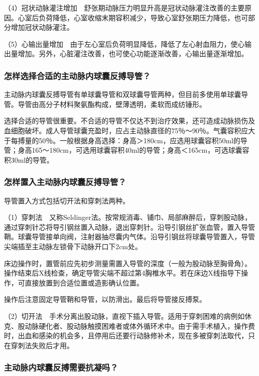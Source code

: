 （4）冠状动脉灌注增加　舒张期动脉压力明显升高是冠状动脉灌注改善的主要原因。心室后负荷降低，心室收缩末期容积减少，导致心室舒张期压力降低，也可部分增加冠状动脉灌注。

（5）心输出量增加　由于左心室后负荷明显降低，降低了左心射血阻力，使心输出量增加。另外，心脏灌注改善，也可使心功能逐渐改善，心输出量逐渐增加。

\subsubsection{怎样选择合适的主动脉内球囊反搏导管？}

主动脉内球囊反搏导管有单球囊导管和双球囊导管两种，但目前多使用单球囊导管。导管由高分子材料聚氨酯构成，壁薄透明，柔软而成纺锤形。

选择合适的导管很重要。不合适的导管不仅达不到治疗效果，还可造成动脉损伤及血细胞破坏。成人导管球囊充盈时，应占主动脉直径的75％～90％。气囊容积应大于每搏量的50％。一般根据身高选择：身高＞180cm，应选用球囊容积50ml的导管；身高165～180cm，可选用球囊容积40ml的导管；身高＜165cm，可选球囊容积30ml的导管。

\subsubsection{怎样置入主动脉内球囊反搏导管？}

导管置入方式包括切开法和穿刺法两种。

（1）穿刺法　又称Seldinger法。按常规消毒、铺巾、局部麻醉后，穿刺股动脉，通过穿刺针芯将导引钢丝置入动脉，退出穿刺针。沿导引钢丝扩张血管，置入导管鞘。球囊导管接单向阀，注射器抽尽囊内气体。沿导引钢丝将球囊导管置入，导管尖端插至主动脉左锁骨下动脉开口下2cm处。

床边操作时，置管前应先初步测量需置入导管的深度（一般为股动脉至胸骨角）。操作结束后X线检查，确定导管尖端不超过第4胸椎水平。若在床边X线指导下操作，可直接放置到合适位置或造影确认位置。

操作后注意固定导管鞘和导管，以防滑出。最后将导管接反搏泵。

（2）切开法　手术分离出股动脉，直视下插入导管。适用于穿刺困难的病例如休克、股动脉硬化者、股动脉触摸困难者或体外循环术中。由于需手术植入，操作费时，出血和感染的机会多，且停用后还要行动脉修补术，现在多被穿刺法取代，只在穿刺法失败后才用。

\subsubsection{主动脉内球囊反搏需要抗凝吗？}

